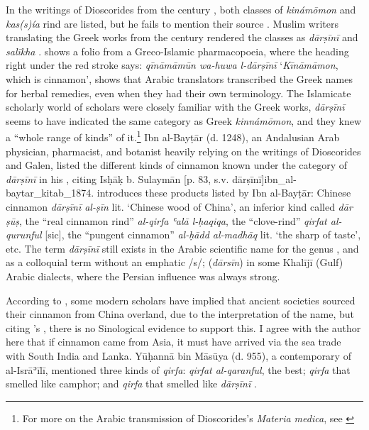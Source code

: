 In the writings of Dioscorides from the  century \AD{}, both classes of  \textit{kinámōmon} and  \textit{kas(s)ía} rind are listed, but he fails to mention their source \parencite{alam_darcini_2011}. Muslim writers translating the Greek works from the  century rendered the classes as \textit{dārṣīnī} and \textit{salīkha} \parencite{alam_darcini_2011}.  shows a folio from a Greco-Islamic pharmacopoeia, where the heading right under the red stroke says: 
\textit{q\={i}n\={a}m\={a}m\={u}n wa-huwa l-d\={a}r\d{s}\={i}n\={i}} `\textit{Kīnāmāmon}, which is cinnamon', shows that Arabic translators transcribed the Greek names for herbal remedies, even when they had their own terminology. The Islamicate scholarly world of scholars were closely familiar with the Greek works, \textit{dārṣīnī} seems to have indicated the same category as Greek \textit{kinnámōmon}, and they knew a ``whole range of kinds'' of it.\footnote{For more on the Arabic transmission of Dioscorides's \textit{Materia medica}, see \textcite{gutas_arabic_2012}} Ibn al-Bayṭār (d. 1248), an Andalusian Arab physician, pharmacist, and botanist heavily relying on the writings of Dioscorides and Galen, listed the different kinds of cinnamon known under the category of \textit{dārṣīnī} in his , citing Isḥāḳ b. Sulaymān [p. 83, s.v. dārṣīnī]{ibn_al-baytar_kitab_1874}. \textcite{dietrich_dar_2004} introduces these products listed by Ibn al-Bayṭār: Chinese cinnamon \textit{dārṣīnī al-ṣīn} lit. `Chinese wood of China', an inferior kind called \textit{dār ṣūṣ}, the ``real cinnamon rind'' \textit{al-qirfa ʿalā l-ḥaqiqa}, the ``clove-rind'' \textit{qirfat al-qurunful} [sic], the ``pungent cinnamon'' \textit{al-ḥādd al-madhāq} lit. `the sharp of taste', etc. The term \textit{dārṣīnī} still exists in the Arabic scientific name for the genus , and as a colloquial term without an emphatic /s/;  (\textit{dārsīn}) in some Khalījī (Gulf) Arabic dialects, where the Persian influence was always strong.

According to \parencite{alam_darcini_2011}, some modern scholars have implied that ancient societies sourced their cinnamon from China overland, due to the interpretation of the name, but citing \textcite{laufer_sino-iranica_1919}'s , there is no Sinological evidence to support this. I agree with the author here that if cinnamon came from Asia, it must have arrived via the sea trade with South India and Lanka. Yūḥannā bin Māsūya (d. 955), a contemporary of al-Isrāʾīlī, mentioned three kinds of \textit{qirfa}: \textit{qirfat al-qaranful}, the best; \textit{qirfa} that smelled like camphor; and \textit{qirfa} that smelled like \textit{dārṣīnī} \parencite{alam_darcini_2011}.

